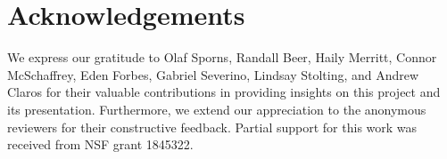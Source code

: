 \section{Acknowledgements}

We express our gratitude to Olaf Sporns, Randall Beer, Haily Merritt, Connor McSchaffrey, Eden Forbes, Gabriel Severino, Lindsay Stolting, and Andrew Claros for their valuable contributions in providing insights on this project and its presentation. Furthermore, we extend our appreciation to the anonymous reviewers for their constructive feedback. Partial support for this work was received from NSF grant 1845322.